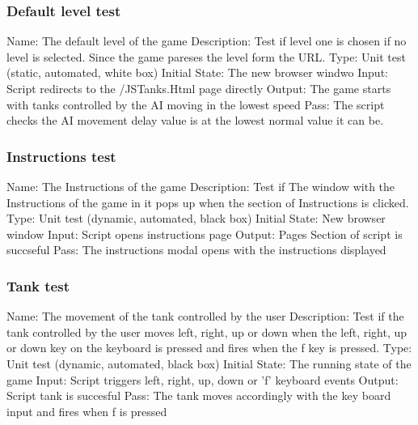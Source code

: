 \documentclass{article}
\begin{document}
\subsubsection{Default level test}
Name:  The default level of the game\newline
Description: Test if level one is chosen if no level is selected. Since the
game pareses the level form the URL.  \newline
Type: Unit test (static, automated, white box) \newline
Initial State: The new browser windwo \newline
Input: Script redirects to the /JSTanks.Html page directly \newline
Output: The game starts with tanks controlled by the AI moving in the lowest 
speed\newline
Pass: The script checks the AI movement delay value is at the lowest normal
 value it can be.\newline

\subsubsection{Instructions test}
Name:  The Instructions of the game\newline
Description: Test if The window with the Instructions of the game in it pops up 
when the section of Instructions is clicked. \newline
Type: Unit test (dynamic, automated, black box) \newline
Initial State: New browser window \newline
Input: Script opens instructions page\newline
Output: Pages Section of script is succseful\newline
Pass:  The instructions modal opens with the instructions displayed  \newline

\subsubsection{Tank test}
Name:  The movement of the tank controlled by the user\newline
Description: Test if the tank controlled by the user moves left, right, up or 
down when the left, right, up or down key on the keyboard is pressed and
fires when the f key is pressed. \newline
Type: Unit test (dynamic, automated, black box) \newline
Initial State:  The running state of the game \newline
Input: Script triggers left, right, up, down or 'f' keyboard events\newline
Output: Script tank is succesful\newline
Pass: The tank moves accordingly with the key board input and 
fires when f is pressed \newline
\end{document}
